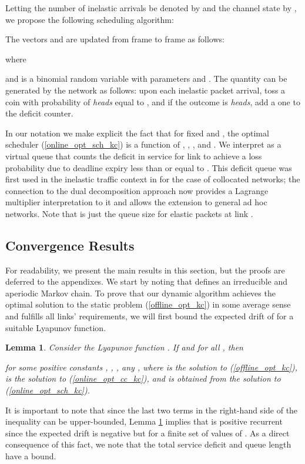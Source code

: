\documentclass[conference]{IEEEtran}
\newtheorem{lemma}{Lemma}
\begin{document}
Letting the number of inelastic arrivals be denoted by  and the channel state by , we propose the following scheduling algorithm:


The vectors  and  are updated from frame to frame as follows:


where


and  is a binomial random variable with parameters  and . The quantity  can be generated by the network as follows: upon each inelastic packet arrival, toss a coin with probability of \emph{heads} equal to , and if the outcome is \emph{heads}, add a one to the deficit counter.

In our notation we make explicit the fact that for fixed  and , the optimal scheduler (\ref{online_opt_sch_kc}) is a function of , , , and . We interpret  as a virtual queue that counts the deficit in service for link  to achieve a loss probability due to deadline expiry less than or equal to . This deficit queue was first used in the inelastic traffic context in \cite{Hou09a} for the case of collocated networks; the connection to the dual decomposition approach now provides a Lagrange multiplier interpretation to it and allows the extension to general ad hoc networks. Note that  is just the queue size for elastic packets at link .

\subsection{Convergence Results}
\label{convergence_kc}

For readability, we present the main results in this section, but the proofs are deferred to the appendixes. We start by noting that  defines an irreducible and aperiodic Markov chain. To prove that our dynamic algorithm achieves the optimal solution to the static problem (\ref{offline_opt_kc}) in some average sense and fulfills all links' requirements, we will first bound the expected drift of  for a suitable Lyapunov function.

\begin{lemma}
\label{expected_drift_kc}
Consider the Lyapunov function . If  and  for all , then

for some positive constants , , , any , where  is the solution to (\ref{offline_opt_kc}),  is the solution to (\ref{online_opt_cc_kc}), and  is obtained from the solution to (\ref{online_opt_sch_kc}).

\end{lemma}

It is important to note that since the last two terms in the right-hand side of the inequality can be upper-bounded, Lemma \ref{expected_drift_kc} implies that  is positive recurrent since the expected drift is negative but for a finite set of values of . As a direct consequence of this fact, we note that the total service deficit and queue length have a  bound.
\end{document}
